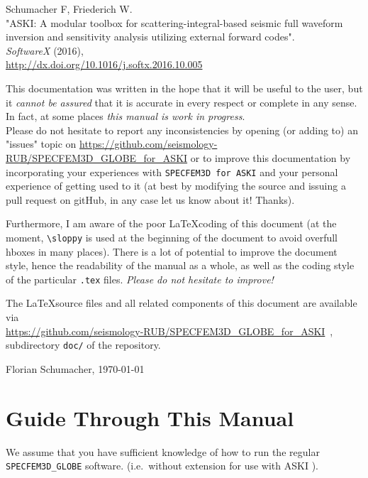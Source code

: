 \documentclass[12pt,a4paper]{article}
\newcommand{\lcode}[1]{\nolinkurl{#1}}
\newcommand{\ASKI}{ {\ttfamily ASKI} }
\begin{document}
Schumacher F, Friederich W.\\
"ASKI: A modular toolbox for scattering-integral-based seismic full waveform 
inversion and sensitivity analysis utilizing external forward codes".\\
\emph{SoftwareX} (2016),\\
\url{http://dx.doi.org/10.1016/j.softx.2016.10.005}

\vspace{1em}

This documentation was written in the hope that it will be useful to the user,
but it \emph{cannot be assured} that it is accurate in every respect or complete in any sense.
In fact, at some places \emph{this manual is work in progress}.\\
Please do not hesitate to report any inconsistencies by
opening (or adding to) an "issues" topic on \url{https://github.com/seismology-RUB/SPECFEM3D_GLOBE_for_ASKI}
or to improve this documentation by incorporating your experiences with \lcode{SPECFEM3D for ASKI} 
and your personal experience of getting used to it (at best by modifying the source and issuing a pull request
on gitHub, in any case let us know about it! Thanks).

Furthermore, I am aware of the poor \LaTeX coding of this document (at the moment, \verb+\sloppy+ is used
at the beginning of the document to avoid overfull hboxes in many places). There is a lot of potential
to improve the document 
style, hence the readability of the manual as a whole, as well as the coding style of the 
particular \lcode{.tex} files. \emph{Please do not hesitate to improve!}

The \LaTeX source files and all related components of this document are available via\\
\url{https://github.com/seismology-RUB/SPECFEM3D_GLOBE_for_ASKI}~, subdirectory 
\lcode{doc/} of the repository.
\begin{flushright}
Florian Schumacher, \mydate \today
\end{flushright}

\newpage
%
\section*{Guide Through This Manual}
%
We assume that you have sufficient knowledge of how to run the regular \lcode{SPECFEM3D_GLOBE} software.
(i.e.\ without extension for use with \ASKI{}).
\end{document}
